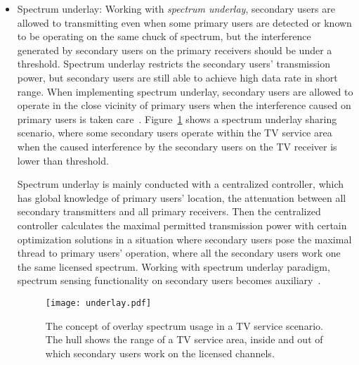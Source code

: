 \begin{itemize}
\item \label{underlay}  Spectrum underlay:
Working with \textit{spectrum underlay}, secondary users are allowed to transmitting even when some primary users are detected or known to be operating on the same chuck of spectrum, but the interference generated by secondary users on the primary receivers should be under a threshold. 
Spectrum underlay restricts the secondary users' transmission power, but secondary users are still able to achieve high data rate in short range.
When implementing spectrum underlay, secondary users are allowed to operate in the close vicinity of primary users when the interference caused on primary users is taken care~\cite{Ellingsaeter2012_Increasing_Available}.
Figure~\ref{underlay} shows a spectrum underlay sharing scenario, where some secondary users operate within the TV service area when the caused interference by the secondary users on the TV receiver is lower than threshold.

Spectrum underlay is mainly conducted with a centralized controller, which has global knowledge of primary users' location, the attenuation between all secondary transmitters and all primary receivers.
Then the centralized controller calculates the maximal permitted transmission power with certain optimization solutions in a situation where secondary users pose the maximal thread to primary users' operation, where all the secondary users work one the same licensed spectrum.
Working with spectrum underlay paradigm, spectrum sensing functionality on secondary users becomes auxiliary~\cite{FCC_2010_sedond_memorandumm, ecc159}.
	\begin{figure}[h!]
	  \centering
	  \texttt{[image: underlay.pdf]}
	  \caption{The concept of overlay spectrum usage in a TV service scenario. The hull shows the range of a TV service area, inside and out of which secondary users work on the licensed channels.}
	\label{underlay}
	\end{figure}



\end{itemize}
